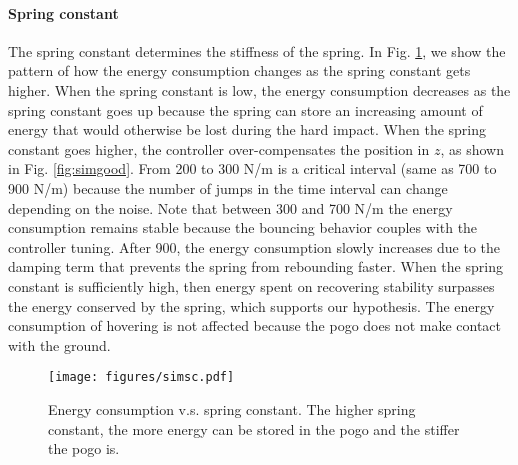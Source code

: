 \documentclass[letterpaper,10pt,conference]{ieeeconf}
\begin{document}
{\paragraph{Spring constant}{
The spring constant  determines the stiffness of the spring.
%
In Fig. \ref{fig:simsc}, we show the pattern of how the energy consumption changes as the spring constant gets higher. When the spring constant is low, the energy consumption decreases as the spring constant goes up because the spring can store an increasing amount of energy that would otherwise be lost during the hard impact. When the spring constant goes higher, the controller over-compensates the position in $z$, as shown in Fig. \ref{fig:simgood}. 
%
From 200 to 300 N/m is a critical interval (same as 700 to 900 {N/m}) because the number of jumps in the time interval can change depending on the noise. 
Note that between 300 and 700 N/m the energy consumption remains stable because the bouncing behavior couples with the controller tuning. After 900, the energy consumption slowly increases due to the damping term that prevents the spring from rebounding faster. When the spring constant is sufficiently high, then energy spent on recovering stability surpasses the energy conserved by the spring, which supports our hypothesis. The energy consumption of hovering is not affected because the pogo does not make contact with the ground.
\begin{figure}[t!]
    \texttt{[image: figures/simsc.pdf]}
    \caption{Energy consumption v.s. spring constant. The higher spring constant, the more energy can be stored in the pogo and the stiffer the pogo is.}
    \label{fig:simsc}
\end{figure}
}

\noindent
}
\end{document}
